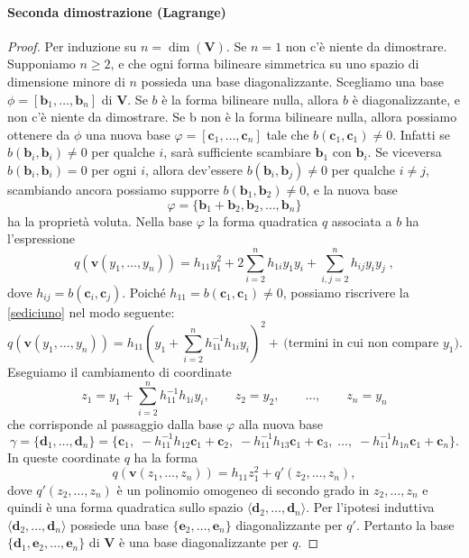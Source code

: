 \documentclass{article}
\theoremstyle{plain}
\theoremstyle{definition}
\theoremstyle{remark}
\begin{document}
\paragraph{Seconda dimostrazione (Lagrange)}
\begin{proof}
Per induzione su $n = \dim(\mathbf{V})$. Se $n = 1$ non c'è niente da dimostrare. Supponiamo $n \geq 2$, e 
che ogni forma bilineare simmetrica su uno spazio di dimensione minore di $n$ possieda una base diagonalizzante. 
Scegliamo una base $\phi = [\mathbf{b}_1, \ldots, \mathbf{b}_n]$ di $\mathbf{V}$. Se $b$ è la forma bilineare 
nulla, allora $b$ è diagonalizzante, e non c'è niente da dimostrare. Se b non è la forma bilineare nulla, 
allora possiamo ottenere da $\phi$ una nuova base $\varphi = [\mathbf{c}_1, \ldots, \mathbf{c}_n]$ tale che 
$b(\mathbf{c}_1, \mathbf{c}_1) \neq 0$. Infatti se $b(\mathbf{b}_i, \mathbf{b}_i) \neq 0$ per qualche $i$, 
sarà sufficiente scambiare $\mathbf{b}_1$ con $\mathbf{b}_i$. Se viceversa $b(\mathbf{b}_i, \mathbf{b}_i) = 0$ 
per ogni $i$, allora dev'essere $b(\mathbf{b}_i, \mathbf{b}_j) \neq 0$ per qualche $i \neq j$, scambiando ancora 
possiamo supporre $b(\mathbf{b}_1, \mathbf{b}_2) \neq 0$, e la nuova base
\[\varphi = \{\mathbf{b}_1 + \mathbf{b}_2, \mathbf{b}_2, \ldots, \mathbf{b}_n\}\]
ha la proprietà voluta. Nella base $\varphi$ la forma quadratica $q$ associata a $b$ ha l'espressione
\begin{equation}\label{sediciuno}
q(\mathbf{v}(y_1, \ldots, y_n)) = h_{11}y_1^2 + 2\sum_{i=2}^n h_{1i}y_1y_i + \sum_{i,j=2}^n h_{ij}y_iy_j\;,
\end{equation}
dove $h_{ij} = b(\mathbf{c}_i, \mathbf{c}_j)$. Poiché $h_{11} = b(\mathbf{c}_1, \mathbf{c}_1) \neq 0$, possiamo 
riscrivere la \ref{sediciuno} nel modo seguente:
\[q(\mathbf{v}(y_1, \ldots, y_n)) = h_{11}\left(y_1 + \sum_{i=2}^n h_{11}^{-1}h_{1i}y_i\right)^2 + \,\text{(termini in cui non compare $y_1$)}.\]
Eseguiamo il cambiamento di coordinate
\[z_1 = y_1 + \sum_{i=2}^n h_{11}^{-1} h_{1i} y_i, \quad\quad z_2 = y_2,\quad\quad \ldots,\quad\quad z_n = y_n\]
che corrisponde al passaggio dalla base $\varphi$ alla nuova base
\[\gamma = \{\mathbf{d}_1, \ldots, \mathbf{d}_n\} = \{\mathbf{c}_1,\;  - h_{11}^{-1} h_{12} \mathbf{c}_1+\mathbf{c}_2,\; - h_{11}^{-1} h_{13} \mathbf{c}_1+\mathbf{c}_3,\; \ldots,\; - h_{11}^{-1} h_{1n}\mathbf{c}_1+\mathbf{c}_n\}.\]
In queste coordinate $q$ ha la forma
\[q(\mathbf{v}(z_1, \ldots, z_n)) = h_{11} z_1^2 + q'(z_2, \ldots, z_n),\]
dove $q'(z_2, \ldots, z_n)$ è un polinomio omogeneo di secondo grado in $z_2, \ldots, z_n$ e quindi è una forma quadratica sullo spazio 
$\langle \mathbf{d}_2, \ldots, \mathbf{d}_n \rangle$. Per l'ipotesi induttiva $\langle \mathbf{d}_2, \ldots, \mathbf{d}_n \rangle$ possiede 
una base $\{\mathbf{e}_2, \ldots, \mathbf{e}_n\}$ diagonalizzante per $q'$. Pertanto la base $\{\mathbf{d}_1, \mathbf{e}_2, \ldots, \mathbf{e}_n\}$ 
di $\mathbf{V}$ è una base diagonalizzante per $q$.    
\end{proof}
\end{document}
